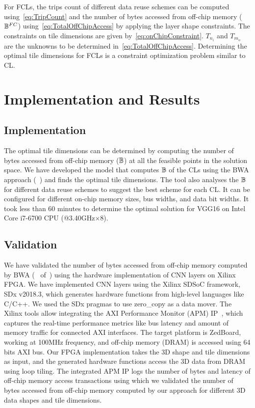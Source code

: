 For FCLs, the trips count of different data reuse schemes can be computed using~\eqref{eq:TripCount} and the number of bytes accessed from off-chip memory ($\mathbb{B}^{FC}$) using~\eqref{eq:TotalOffChipAccess} by applying the layer shape constraints. The constraints on tile dimensions are given by~\eqref{eq:onChipConstraint}. $T_{n_i}$ and $T_{m_o}$ are the unknowns to be determined in~\eqref{eq:TotalOffChipAccess}. Determining the optimal tile dimensions for FCLs is a constraint optimization problem similar to CL.
\section{Implementation and Results}
\subsection{Implementation}
The optimal tile dimensions can be determined by computing the number of bytes accessed from off-chip memory ($\mathbb{B}$) at all the feasible points in the solution space. 
We have developed the model that computes $\mathbb{B}$ of the CLs using the BWA approach (~) and finds the optimal tile dimensions. The tool also analyses the $\mathbb{B}$ for different data reuse schemes to suggest the best scheme for each CL. It can be configured for different on-chip memory sizes, bus widths, and data bit widths. It took less than 60 minutes to determine the optimal solution for VGG16 on Intel Core i7-6700 CPU (@3.40GHz$\times$8).
\subsection{Validation}\label{Validation}
We have validated the number of bytes accessed from off-chip memory computed by BWA (~ of~) using the hardware implementation of CNN layers on Xilinx FPGA. We have implemented CNN layers using the Xilinx SDSoC framework, SDx v2018.3, which generates hardware functions from high-level languages like C/C++. We used the SDx pragmas to use zero\_copy as a data mover. The Xilinx tools allow integrating the AXI Performance Monitor (APM) IP~\cite{APM}, which captures the real-time performance metrics like bus latency and amount of memory traffic for connected AXI interfaces. The target platform is ZedBoard, working at 100MHz frequency, and off-chip memory (DRAM) is accessed using 64 bits AXI bus. 
Our FPGA implementation takes the 3D shape and tile dimensions as input, and the generated hardware functions access the 3D data from DRAM using loop tiling. The integrated APM IP logs the number of bytes and latency of off-chip memory access transactions using which we validated the number of bytes accessed from off-chip memory computed by our approach for different 3D data shapes and tile dimensions.
